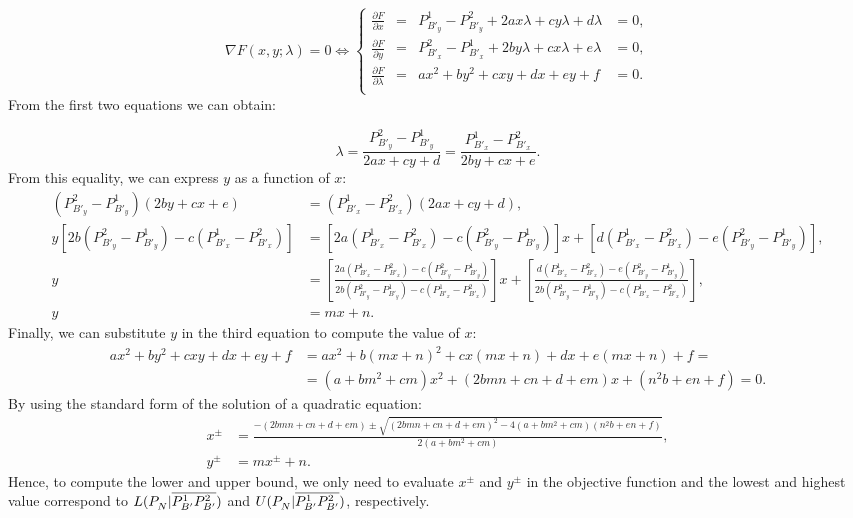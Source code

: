 \documentclass[a4paper]{elsarticle}
\begin{document}
$$\nabla F(x,y;\lambda)=0\Longleftrightarrow
\left\{\begin{array}{rcll}
\frac{\partial F}{\partial x} & = & P^{1}_{B'_y}-P^{2}_{B'_y}+2ax\lambda+cy\lambda+d\lambda& =0,\\
\frac{\partial F}{\partial y} & = & P^{2}_{B'_x}-P^{1}_{B'_x}+2by\lambda+cx\lambda+e\lambda& =0,\\
\frac{\partial F}{\partial \lambda} & = & ax^2+by^2+cxy+dx+ey+f& =0.\\
\end{array}\right.$$
From the first two equations we can obtain:

$$\lambda = \frac{P^{2}_{B'_y}-P^{1}_{B'_y}}{2ax+cy+d}=\frac{P^{1}_{B'_x}-P^{2}_{B'_x}}{2by+cx+e}.$$
From this equality, we can express $y$ as a function of $x$:
\begin{align*}
(P^{2}_{B'_y}-P^{1}_{B'_y})(2by+cx+e)&=(P^{1}_{B'_x}-P^{2}_{B'_x})(2ax+cy+d),\\
y\left[2b(P^{2}_{B'_y}-P^{1}_{B'_y})-c(P^{1}_{B'_x}-P^{2}_{B'_x})\right]&=\left[2a(P^{1}_{B'_x}-P^{2}_{B'_x})-c(P^{2}_{B'_y}-P^{1}_{B'_y})\right]x+\left[d(P^{1}_{B'_x}-P^{2}_{B'_x})-e(P^{2}_{B'_y}-P^{1}_{B'_y})\right],\\
y&=\left[\frac{2a(P^{1}_{B'_x}-P^{2}_{B'_x})-c(P^{2}_{B'_y}-P^{1}_{B'_y})}{2b(P^{2}_{B'_y}-P^{1}_{B'_y})-c(P^{1}_{B'_x}-P^{2}_{B'_x})}\right]x+\left[\frac{d(P^{1}_{B'_x}-P^{2}_{B'_x})-e(P^{2}_{B'_y}-P^{1}_{B'_y})}{2b(P^{2}_{B'_y}-P^{1}_{B'_y})-c(P^{1}_{B'_x}-P^{2}_{B'_x})}\right],\\
y&=mx+n.
\end{align*}
Finally, we can substitute $y$ in the third equation to compute the value of $x$:
\begin{align*}
ax^2+by^2+cxy+dx+ey+f &= ax^2+b(mx+n)^2+cx(mx+n)+dx+e(mx+n)+f =\\
&= (a+bm^2+cm)x^2+(2bmn+cn+d+em)x+(n^2b+en+f)=0.
\end{align*}
By using the standard form of the solution of a quadratic equation:
\begin{align*}
x^{\pm}&=\frac{-(2bmn+cn+d+em)\pm\sqrt{(2bmn+cn+d+em)^2-4(a+bm^2+cm)(n^2b+en+f)}}{2(a+bm^2+cm)},\\
y^{\pm}&=mx^{\pm}+n.
\end{align*}
Hence, to compute the lower and upper bound, we only need to evaluate $x^{\pm}$ and $y^{\pm}$ in the objective function and the lowest and highest value correspond to $L(P_N^{}|\overline{P_{B'}^1P_{B'}^2})$ and $U(P_N^{}|\overline{P_{B'}^1P_{B'}^2})$, respectively.
\end{document}
